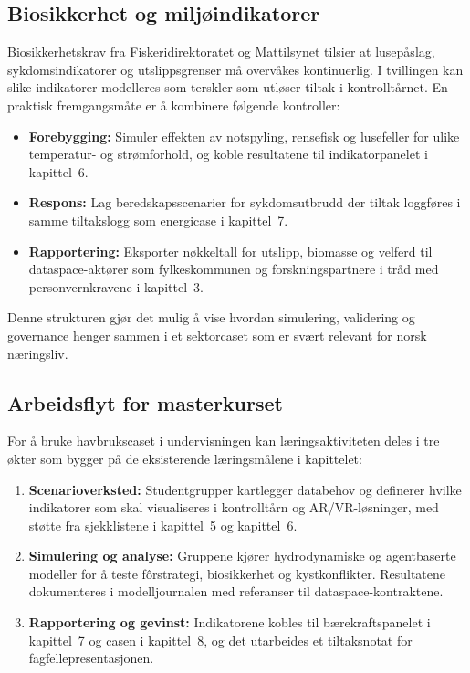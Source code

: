 \subsection{Biosikkerhet og miljøindikatorer}
Biosikkerhetskrav fra Fiskeridirektoratet og Mattilsynet tilsier at lusepåslag, sykdomsindikatorer og utslippsgrenser må overvåkes kontinuerlig.\citep{fiskeridirektoratet2024biosikkerhet,mattilsynet2023lusestrategi} I tvillingen kan slike indikatorer modelleres som terskler som utløser tiltak i kontrolltårnet. En praktisk fremgangsmåte er å kombinere følgende kontroller:
\begin{itemize}
    \item \textbf{Forebygging:} Simuler effekten av notspyling, rensefisk og lusefeller for ulike temperatur- og strømforhold, og koble resultatene til indikatorpanelet i kapittel~6.
    \item \textbf{Respons:} Lag beredskapsscenarier for sykdomsutbrudd der tiltak loggføres i samme tiltakslogg som energicase i kapittel~7.
    \item \textbf{Rapportering:} Eksporter nøkkeltall for utslipp, biomasse og velferd til dataspace-aktører som fylkeskommunen og forskningspartnere i tråd med personvernkravene i kapittel~3.
\end{itemize}
Denne strukturen gjør det mulig å vise hvordan simulering, validering og governance henger sammen i et sektorcaset som er svært relevant for norsk næringsliv.

\subsection{Arbeidsflyt for masterkurset}
For å bruke havbrukscaset i undervisningen kan læringsaktiviteten deles i tre økter som bygger på de eksisterende læringsmålene i kapittelet:
\begin{enumerate}
    \item \textbf{Scenarioverksted:} Studentgrupper kartlegger databehov og definerer hvilke indikatorer som skal visualiseres i kontrolltårn og AR/VR-løsninger, med støtte fra sjekklistene i kapittel~5 og kapittel~6.
    \item \textbf{Simulering og analyse:} Gruppene kjører hydrodynamiske og agentbaserte modeller for å teste fôrstrategi, biosikkerhet og kystkonflikter. Resultatene dokumenteres i modelljournalen med referanser til dataspace-kontraktene.
    \item \textbf{Rapportering og gevinst:} Indikatorene kobles til bærekraftspanelet i kapittel~7 og casen i kapittel~8, og det utarbeides et tiltaksnotat for fagfellepresentasjonen.
\end{enumerate}

